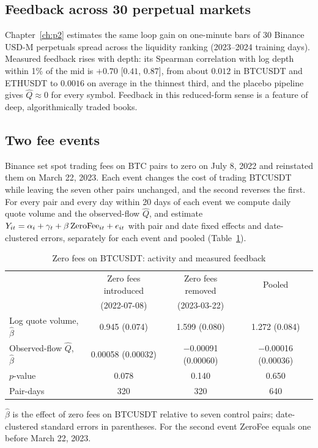 \subsection{Feedback across 30 perpetual markets}

Chapter~\ref{ch:p2} estimates the same loop gain on one-minute bars of 30 Binance USD-M perpetuals spread across the liquidity ranking (2023--2024 training days). Measured feedback rises with depth: its Spearman correlation with log depth within 1\% of the mid is $+0.70$ [$0.41$, $0.87$], from about $0.012$ in BTCUSDT and ETHUSDT to $0.0016$ on average in the thinnest third, and the placebo pipeline gives $\hat Q\approx0$ for every symbol. Feedback in this reduced-form sense is a feature of deep, algorithmically traded books.

\subsection{Two fee events}

Binance set spot trading fees on BTC pairs to zero on July 8, 2022 and reinstated them on March 22, 2023. Each event changes the cost of trading BTCUSDT while leaving the seven other pairs unchanged, and the second reverses the first. For every pair and every day within 20 days of each event we compute daily quote volume and the observed-flow $\hat Q$, and estimate $Y_{it}=\alpha_i+\gamma_t+\beta\,{\rm ZeroFee}_{it}+e_{it}$ with pair and date fixed effects and date-clustered errors, separately for each event and pooled (Table~\ref{p1:tab:fee2}).

\begin{table}[t]\centering\small
\begin{threeparttable}
\caption{Zero fees on BTCUSDT: activity and measured feedback}\label{p1:tab:fee2}
\begin{tabular}{lccc}
\toprule
 & Zero fees introduced & Zero fees removed & Pooled\\
 & (2022-07-08) & (2023-03-22) & \\
\midrule
Log quote volume, $\hat\beta$ & 0.945 (0.074) & 1.599 (0.080) & 1.272 (0.084)\\
Observed-flow $\hat Q$, $\hat\beta$ & 0.00058 (0.00032) & $-$0.00091 (0.00060) & $-$0.00016 (0.00036)\\
\quad $p$-value & 0.078 & 0.140 & 0.650\\
Pair-days & 320 & 320 & 640\\
\bottomrule
\end{tabular}
\begin{tablenotes}\footnotesize\item $\hat\beta$ is the effect of zero fees on BTCUSDT relative to seven control pairs; date-clustered standard errors in parentheses. For the second event ZeroFee equals one before March 22, 2023. \end{tablenotes}
\end{threeparttable}
\end{table}

